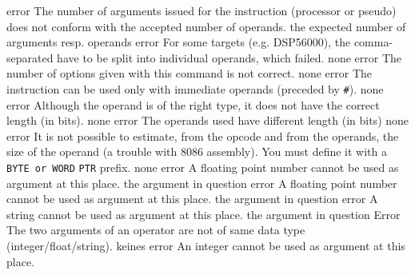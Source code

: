 \documentclass[12pt,twoside]{report}
\newcommand{\tty}[1]{{\tt #1}}
\begin{document}
\begin{description}
               {error}
               {The number of arguments issued for the instruction (processor or
                pseudo) does not conform with the accepted number of
                operands.}
               {the expected number of arguments resp. operands}
               {error}
               {For some targets (e.g. DSP56000), the
                comma-separated have to be split into individual
                operands, which failed.}
               {none}
               {error}
               {The number of options given with this command is not
                correct.}
               {none}
               {error}
               {The instruction can be used only with immediate operands
                (preceded by \tty{\#}).}
               {none}
               {error}
               {Although the operand is of the right type, it does not have
                the correct length (in bits).}
               {none}
               {error}
               {The operands used have different length (in bits)}
               {none}
               {error}
               {It is not possible to estimate, from the opcode and from
                the operands, the size of the operand (a trouble with
                8086 assembly). You must define it with a \tty{BYTE or WORD}
                \tty{PTR} prefix.}
               {none}
               {error}
               {A floating point number cannot be used as argument at this place.}
               {the argument in question}
               {error}
               {A floating point number cannot be used as argument at this place.}
               {the argument in question}
               {error}
               {A string cannot be used as argument at this place.}
               {the argument in question}
               {Error}
               {The two arguments of an operator are not of same
                data type (integer/\-float/\-string).}
               {keines}
               {error}
               {An integer cannot be used as argument at this place.}

\end{description}
\end{document}
